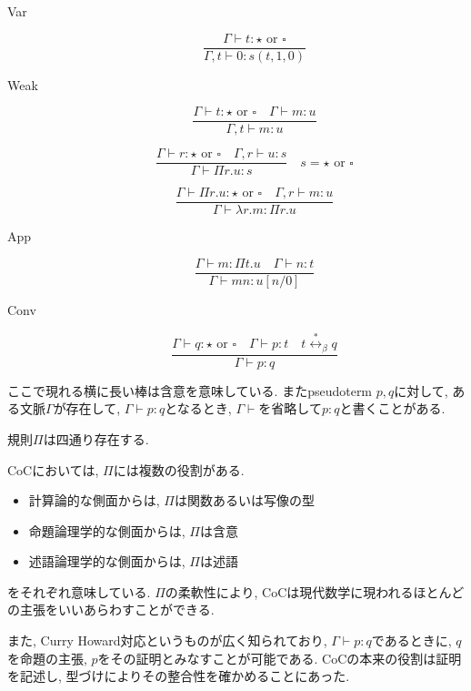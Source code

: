 \documentclass[12pt, titlepage]{ltjsarticle}
\begin{document}
\begin{defn}
\begin{description}
  \item[Var] \[ \frac{\Gamma \vdash t {\colon} {\star} \text{ or } {\square}}{\Gamma, t \vdash 0 {\colon} s(t, 1, 0)} \]
  \item[Weak] \[ \frac{\Gamma \vdash t {\colon} {\star} \text{ or } \square \quad \Gamma \vdash m {\colon} u}{\Gamma, t \vdash m {\colon} u} \]
  \item[\Pi] \[ \frac{\Gamma \vdash r {\colon} {\star} \text{ or } {\square} \quad \Gamma, r \vdash u {\colon} s}{\Gamma \vdash \Pi r. u {\colon} s}
             \quad
             s = {\star} \text{ or } {\square} \]
  \item[\lambda] \[ \frac{\Gamma \vdash \Pi r. u {\colon} {\star} \text{ or } {\square} \quad \Gamma, r \vdash m : u}{\Gamma \vdash \lambda r. m {\colon} \Pi r. u} \]
  \item[App] \[ \frac{\Gamma \vdash m : \Pi t. u \quad \Gamma \vdash n : t}{\Gamma \vdash m n {\colon} u[n/0]} \]
  \item[Conv] \[\frac{\Gamma \vdash q {\colon} {\star} \text{ or } {\square} \quad \Gamma \vdash p {\colon} t \quad t \overset{*}{\leftrightarrow}_\beta q}{\Gamma \vdash p {\colon} q} \]
 \end{description}
 ここで現れる横に長い棒は含意を意味している. またpseudoterm $p, q$に対して, ある文脈$\Gamma$が存在して, $\Gamma \vdash p : q$となるとき, $\Gamma \vdash$を省略して$p : q$と書くことがある.
\end{defn}

\begin{rem}
 規則$\Pi$は四通り存在する.
\end{rem}

CoCにおいては, $\Pi$には複数の役割がある.
\begin{itemize}
 \item 計算論的な側面からは, $\Pi$は関数あるいは写像の型
 \item 命題論理学的な側面からは, $\Pi$は含意
 \item 述語論理学的な側面からは, $\Pi$は述語
\end{itemize}
をそれぞれ意味している. $\Pi$の柔軟性により, CoCは現代数学に現われるほとんどの主張をいいあらわすことができる.

また, Curry Howard対応というものが広く知られており, $\Gamma \vdash p : q$であるときに, $q$を命題の主張, $p$をその証明とみなすことが可能である. CoCの本来の役割は証明を記述し, 型づけによりその整合性を確かめることにあった.

\end{document}
